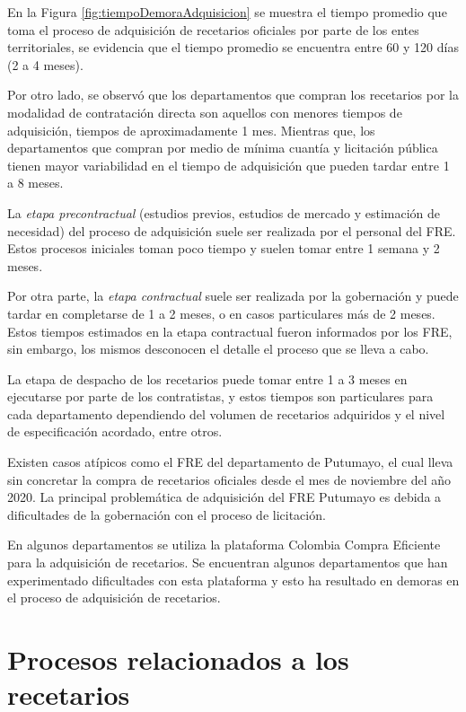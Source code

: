 \documentclass[
  oneside]{book}
\begin{document}
En la Figura \ref{fig:tiempoDemoraAdquisicion} se muestra el tiempo promedio que toma el proceso de adquisición de recetarios oficiales por parte de los entes territoriales, se evidencia que el tiempo promedio se encuentra entre 60 y 120 días (2 a 4 meses).

Por otro lado, se observó que los departamentos que compran los recetarios por la modalidad de contratación directa son aquellos con menores tiempos de adquisición, tiempos de aproximadamente 1 mes. Mientras que, los departamentos que compran por medio de mínima cuantía y licitación pública tienen mayor variabilidad en el tiempo de adquisición que pueden tardar entre 1 a 8 meses.

La \emph{etapa precontractual} (estudios previos, estudios de mercado y estimación de necesidad) del proceso de adquisición suele ser realizada por el personal del FRE. Estos procesos iniciales toman poco tiempo y suelen tomar entre 1 semana y 2 meses.

Por otra parte, la \emph{etapa contractual} suele ser realizada por la gobernación y puede tardar en completarse de 1 a 2 meses, o en casos particulares más de 2 meses. Estos tiempos estimados en la etapa contractual fueron informados por los FRE, sin embargo, los mismos desconocen el detalle el proceso que se lleva a cabo.

La etapa de despacho de los recetarios puede tomar entre 1 a 3 meses en ejecutarse por parte de los contratistas, y estos tiempos son particulares para cada departamento dependiendo del volumen de recetarios adquiridos y el nivel de especificación acordado, entre otros.

Existen casos atípicos como el FRE del departamento de Putumayo, el cual lleva sin concretar la compra de recetarios oficiales desde el mes de noviembre del año 2020. La principal problemática de adquisición del FRE Putumayo es debida a dificultades de la gobernación con el proceso de licitación.

En algunos departamentos se utiliza la plataforma Colombia Compra Eficiente para la adquisición de recetarios. Se encuentran algunos departamentos que han experimentado dificultades con esta plataforma y esto ha resultado en demoras en el proceso de adquisición de recetarios.

\hypertarget{procesos-relacionados-a-los-recetarios}{%
\section{Procesos relacionados a los recetarios}\label{procesos-relacionados-a-los-recetarios}}
\end{document}
